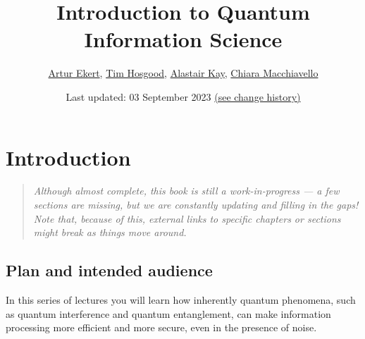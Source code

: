 \documentclass[fleqn]{article}
\title{Introduction to Quantum Information Science}
\author{\href{https://www.arturekert.org/}{Artur Ekert}, \href{https://thosgood.com}{Tim Hosgood}, \href{http://www.ma.rhul.ac.uk/akay/}{Alastair Kay}, \href{https://fisica.unipv.it/personale/Persona.php?ID=55}{Chiara Macchiavello}}
\date{Last updated: 03 September 2023 \href{https://github.com/thosgood/qubit.guide/commits/main}{(see change history)}}
\renewcommand{\leq}{\leqslant}
\renewcommand{\geq}{\geqslant}
\let\oldsection\section
\renewcommand\section{\clearpage\oldsection}
\begin{document}
\setcounter{tocdepth}{2}
\maketitle

\hypertarget{introduction}{%
\section*{Introduction}\label{introduction}}

\providecommand{\xmapsto}[1]{\overset{#1}{\longmapsto}}
\providecommand{\bra}[1]{\langle#1|}
\providecommand{\ket}[1]{|#1\rangle}
\providecommand{\braket}[2]{\langle#1|#2\rangle}
\providecommand{\proj}[1]{|#1\rangle\langle#1|}
\providecommand{\av}[1]{\langle#1\rangle}
\providecommand{\tr}{\operatorname{tr}}
\providecommand{\id}{\mathbf{1}}
\providecommand{\diag}[2]{\begin{bmatrix}#1&0\\0&#2\end{bmatrix}}
\providecommand{\smalldiag}[2]{\left(\begin{smallmatrix}#1&0\\0&#2\end{smallmatrix}\right)}
\providecommand{\mqty}[1]{\begin{matrix}#1\end{matrix}}
\providecommand{\bmqty}[1]{\begin{bmatrix}#1\end{bmatrix}}
\renewcommand{\leq}{\leqslant}
\renewcommand{\geq}{\geqslant}

\begin{quote}
\emph{Although almost complete, this book is still a work-in-progress --- a few sections are missing, but we are constantly updating and filling in the gaps!}
\emph{Note that, because of this, external links to specific chapters or sections might break as things move around.}
\end{quote}

\hypertarget{plan-and-intended-audience}{%
\subsection*{Plan and intended audience}\label{plan-and-intended-audience}}

In this series of lectures you will learn how inherently quantum phenomena, such as quantum interference and quantum entanglement, can make information processing more efficient and more secure, even in the presence of noise.
\end{document}
